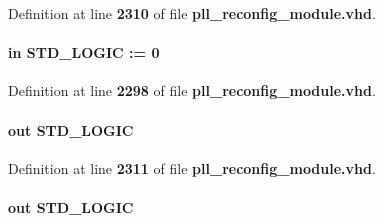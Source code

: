 Definition at line {\bf 2310} of file {\bf pll\+\_\+reconfig\+\_\+module.\+vhd}.

\paragraph[{pll\+\_\+areset\+\_\+in}]{ {\bfseries \textcolor{keywordflow}{in}\textcolor{vhdlchar}{ }} {\bfseries \textcolor{comment}{S\+T\+D\+\_\+\+L\+O\+G\+IC}\textcolor{vhdlchar}{ }\textcolor{vhdlchar}{ }\textcolor{vhdlchar}{\+:}\textcolor{vhdlchar}{=}\textcolor{vhdlchar}{ }\textcolor{vhdlchar}{ }\textcolor{vhdlchar}{\textquotesingle{}}\textcolor{vhdlchar}{ } \textcolor{vhdldigit}{0} \textcolor{vhdlchar}{ }\textcolor{vhdlchar}{\textquotesingle{}}\textcolor{vhdlchar}{ }} \hspace{0.3cm}{\ttfamily [Port]}}\label{classpll__reconfig__module_a192b25a0a6e02e77075aa1047d8d8e4d}


Definition at line {\bf 2298} of file {\bf pll\+\_\+reconfig\+\_\+module.\+vhd}.

\paragraph[{pll\+\_\+configupdate}]{ {\bfseries \textcolor{keywordflow}{out}\textcolor{vhdlchar}{ }} {\bfseries \textcolor{comment}{S\+T\+D\+\_\+\+L\+O\+G\+IC}\textcolor{vhdlchar}{ }} \hspace{0.3cm}{\ttfamily [Port]}}\label{classpll__reconfig__module_aa924cc33e6648ffdee82ea0bcc449c1b}


Definition at line {\bf 2311} of file {\bf pll\+\_\+reconfig\+\_\+module.\+vhd}.

\paragraph[{pll\+\_\+scanclk}]{ {\bfseries \textcolor{keywordflow}{out}\textcolor{vhdlchar}{ }} {\bfseries \textcolor{comment}{S\+T\+D\+\_\+\+L\+O\+G\+IC}\textcolor{vhdlchar}{ }} \hspace{0.3cm}{\ttfamily [Port]}}\label{classpll__reconfig__module_aeed63d6ce24382f56138b83101f2ba1f}


